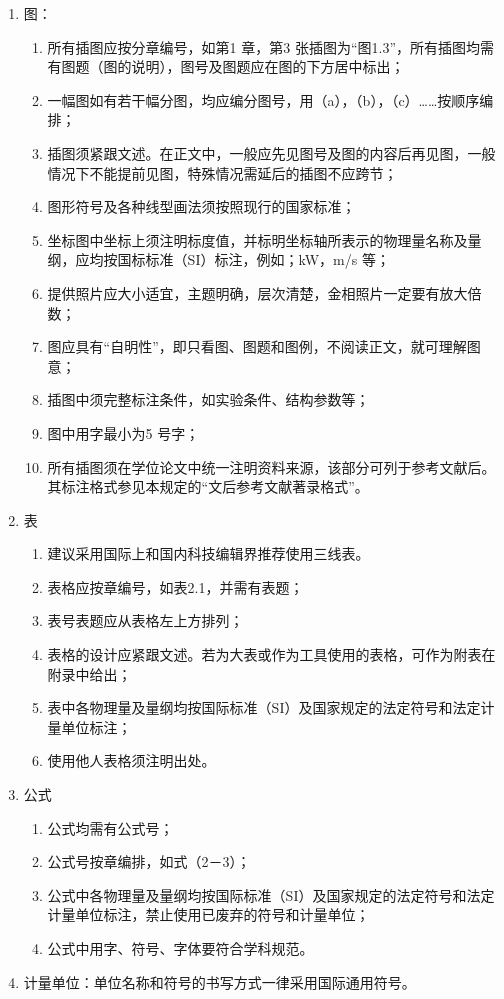 \begin{enumerate}[1)]
    \item 图：
    \begin{enumerate}
        \item 所有插图应按分章编号，如第1 章，第3 张插图为“图1.3”，所有插图均需有图题（图的说明），图号及图题应在图的下方居中标出；
        \item 一幅图如有若干幅分图，均应编分图号，用（a），（b），（c）……按顺序编排；
        \item 插图须紧跟文述。在正文中，一般应先见图号及图的内容后再见图，一般情况下不能提前见图，特殊情况需延后的插图不应跨节；
        \item 图形符号及各种线型画法须按照现行的国家标准；
        \item 坐标图中坐标上须注明标度值，并标明坐标轴所表示的物理量名称及量纲，应均按国标标准（SI）标注，例如；kW，m/s 等；
        \item 提供照片应大小适宜，主题明确，层次清楚，金相照片一定要有放大倍数；
        \item 图应具有“自明性”，即只看图、图题和图例，不阅读正文，就可理解图意；
        \item 插图中须完整标注条件，如实验条件、结构参数等；
        \item 图中用字最小为5 号字；
        \item 所有插图须在学位论文中统一注明资料来源，该部分可列于参考文献后。其标注格式参见本规定的“文后参考文献著录格式”。
    \end{enumerate}
    \item 表
    \begin{enumerate}
        \item 建议采用国际上和国内科技编辑界推荐使用三线表。
        \item 表格应按章编号，如表2.1，并需有表题；
        \item 表号表题应从表格左上方排列；
        \item 表格的设计应紧跟文述。若为大表或作为工具使用的表格，可作为附表在附录中给出；
        \item 表中各物理量及量纲均按国际标准（SI）及国家规定的法定符号和法定计量单位标注；
        \item 使用他人表格须注明出处。
    \end{enumerate}
    \item 公式
    \begin{enumerate}
        \item 公式均需有公式号；
        \item 公式号按章编排，如式（2－3）；
        \item 公式中各物理量及量纲均按国际标准（SI）及国家规定的法定符号和法定计量单位标注，禁止使用已废弃的符号和计量单位；
        \item 公式中用字、符号、字体要符合学科规范。
    \end{enumerate}
    \item 计量单位：单位名称和符号的书写方式一律采用国际通用符号。
\end{enumerate}


